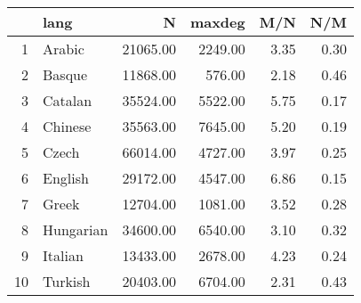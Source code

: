 \begin{table}[ht]
\centering
\begin{tabular}{rlrrrr}
	\toprule
	  & lang & N & maxdeg & M/N & N/M \\
	\midrule
	1 & Arabic & 21065.00 & 2249.00 & 3.35 & 0.30 \\
	2 & Basque & 11868.00 & 576.00 & 2.18 & 0.46 \\
	3 & Catalan & 35524.00 & 5522.00 & 5.75 & 0.17 \\
	4 & Chinese & 35563.00 & 7645.00 & 5.20 & 0.19 \\
	5 & Czech & 66014.00 & 4727.00 & 3.97 & 0.25 \\
	6 & English & 29172.00 & 4547.00 & 6.86 & 0.15 \\
	7 & Greek & 12704.00 & 1081.00 & 3.52 & 0.28 \\
	8 & Hungarian & 34600.00 & 6540.00 & 3.10 & 0.32\\
	9 & Italian & 13433.00 & 2678.00 & 4.23 & 0.24 \\
	10 & Turkish & 20403.00 & 6704.00 & 2.31 & 0.43 \\
	\bottomrule
\end{tabular}
\end{table}
